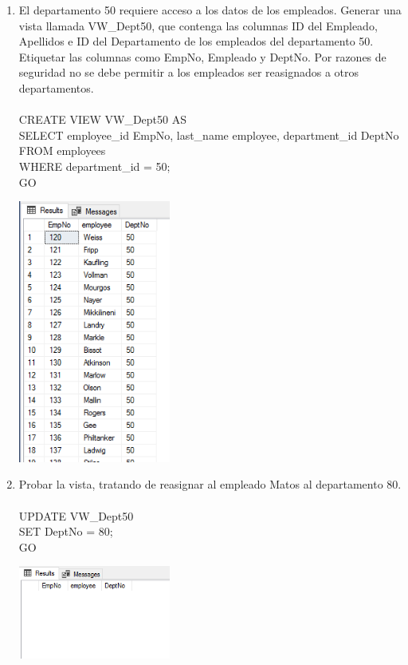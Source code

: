 \begin{enumerate}[1.]
	\item El departamento 50 requiere acceso a los datos de los empleados. Generar una vista llamada VW\_Dept50, que contenga las columnas ID del Empleado, Apellidos e ID del Departamento de los empleados del departamento 50. Etiquetar las columnas como EmpNo, Empleado y DeptNo. Por razones de seguridad no se debe permitir a los empleados ser reasignados a otros departamentos.
	\\
	\\CREATE VIEW VW\_Dept50 AS
	\\SELECT employee\_id EmpNo, last\_name employee, department\_id DeptNo
	\\FROM employees
	\\WHERE department\_id = 50;
	\\GO
	\\
	\begin{center}
	\includegraphics[width=5cm]{./Imagenes/ejercicio3-3} 
	\end{center}

	\item Probar la vista, tratando de reasignar al empleado Matos al departamento 80.
	\\
	\\UPDATE VW\_Dept50
	\\SET DeptNo = 80;
	\\GO
	\\
	\begin{center}
	\includegraphics[width=5cm]{./Imagenes/ejercicio3-4} 
	\end{center}


\end{enumerate}
